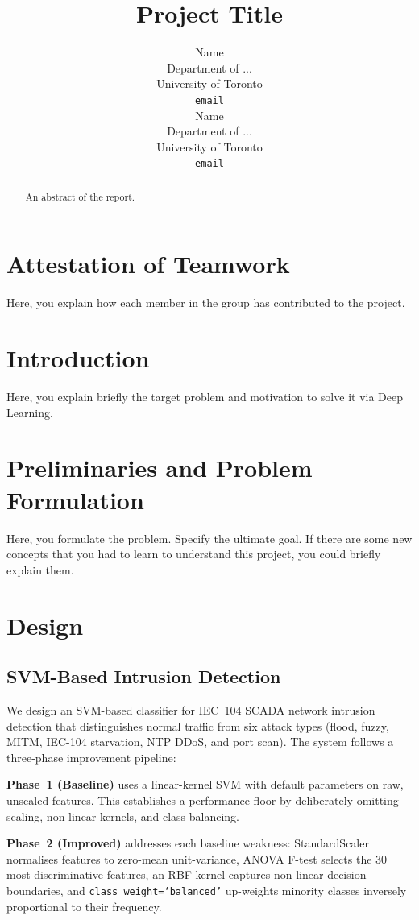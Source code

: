 \documentclass{article}
\title{Project Title}
\author{%
  Name\\
  Department of ...\\
  University of Toronto\\
  \texttt{email} \\
  \And
  Name\\
  Department of ...\\
  University of Toronto\\
  \texttt{email} \\
}
\begin{document}
\maketitle


\begin{abstract}
An abstract of the report.
\end{abstract}

\section*{Attestation of Teamwork}
Here, you explain how each member in the group has contributed to the project. 



\section{Introduction}
Here, you explain briefly the target problem and motivation to solve it via Deep Learning.

\section{Preliminaries and Problem Formulation}
Here, you formulate the problem. Specify the ultimate goal. If there are some new concepts that you had to learn to understand this project, you could briefly explain them. 
	
\section{Design}

\subsection{SVM-Based Intrusion Detection}

We design an SVM-based classifier for IEC~104 SCADA network intrusion detection that distinguishes normal traffic from six attack types (flood, fuzzy, MITM, IEC-104 starvation, NTP DDoS, and port scan). The system follows a three-phase improvement pipeline:

\textbf{Phase~1 (Baseline)} uses a linear-kernel SVM with default parameters on raw, unscaled features. This establishes a performance floor by deliberately omitting scaling, non-linear kernels, and class balancing.

\textbf{Phase~2 (Improved)} addresses each baseline weakness: StandardScaler normalises features to zero-mean unit-variance, ANOVA F-test selects the 30 most discriminative features, an RBF kernel captures non-linear decision boundaries, and \texttt{class\_weight=`balanced'} up-weights minority classes inversely proportional to their frequency.
\end{document}
